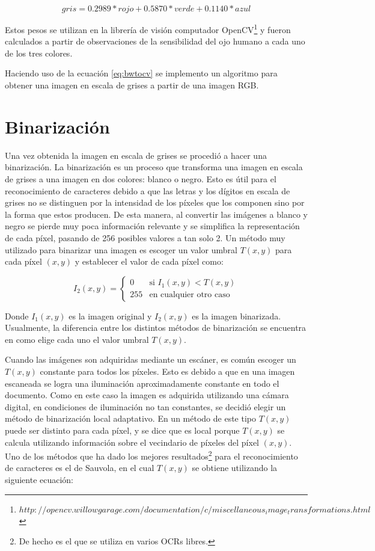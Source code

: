 \documentclass[a4paper, 11pt, oneside]{report}
\begin{document}
\begin{equation}\label{eq:bwtocv}
	gris = 0.2989 * rojo + 0.5870 * verde + 0.1140 * azul 
\end{equation}

Estos pesos se utilizan en la librería de visión computador OpenCV\footnote{$http://opencv.willowgarage.com/documentation/c/miscellaneous_image_transformations.html$} y fueron calculados a partir de observaciones de la sensibilidad del ojo humano a cada uno de los tres colores. 

Haciendo uso de la ecuación \ref{eq:bwtocv} se implemento un algoritmo para obtener una imagen en escala de grises a partir de una imagen RGB. 

\section{Binarización}
\label{sect:binarization}

Una vez obtenida la imagen en escala de grises se procedió a hacer una binarización. La binarización es un proceso que transforma una imagen en escala de grises a una imagen en dos colores: blanco o negro. Esto es útil para el reconocimiento de caracteres debido a que las letras y los dígitos en escala de grises no se distinguen por la intensidad de los píxeles que los componen sino por la forma que estos producen. De esta manera, al convertir las imágenes a blanco y negro se pierde muy poca información relevante y se simplifica la representación de cada píxel, pasando de 256 posibles valores a tan solo 2. Un método muy utilizado para binarizar una imagen es escoger un valor umbral $T(x,y)$ para cada píxel $(x,y)$ y establecer el valor de cada píxel como:

\begin{equation}\label{binEq}
	I_2(x,y) = \left\{ \begin{array}{ll}
		0   & \mbox{si $I_1(x,y) < T(x,y)$} \\
		255 & \mbox{en cualquier otro caso}
	\end{array} \right. 
\end{equation}

Donde $I_1(x,y)$ es la imagen original y $I_2(x,y)$ es la imagen binarizada. Usualmente, la diferencia entre los distintos métodos de binarización se encuentra en como elige cada uno el valor umbral $T(x,y)$.

Cuando las imágenes son adquiridas mediante un escáner, es común escoger un $T(x,y)$ constante para todos los píxeles. Esto es debido a que en una imagen escaneada se logra una iluminación aproximadamente constante en todo el documento. Como en este caso la imagen es adquirida utilizando una cámara digital, en condiciones de iluminación no tan constantes, se decidió elegir un método de binarización local adaptativo. En un método de este tipo $T(x,y)$ puede ser distinto para cada píxel, y se dice que es local porque $T(x,y)$ se calcula utilizando información sobre el vecindario de píxeles del píxel $(x,y)$. Uno de los métodos que ha dado los mejores resultados\footnote{De hecho es el que se utiliza en varios OCRs libres.} para el reconocimiento de caracteres es el de Sauvola, en el cual $T(x,y)$ se obtiene utilizando la siguiente ecuación:
\end{document}
